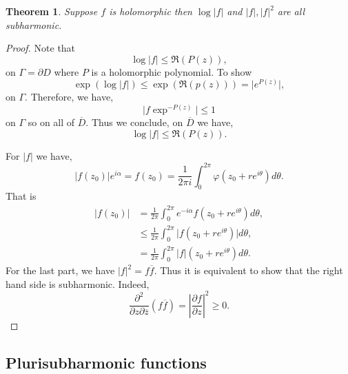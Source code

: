 \documentclass{article}
\newtheorem{theorem}{Theorem} [section]
\newcommand{\bd}[0]{\partial}
\newcommand{\normal}[0]{{\frac {1} {2\pi i}}}
\begin{document}
\begin{theorem}
  Suppose $f$ is holomorphic then $\log\vert f\vert$ and $\vert f\vert,\vert f\vert^2$ are all subharmonic.
\end{theorem}

\begin{proof}
  Note that 
  \begin{equation*}
    \log\vert f\vert\leq\Re(P(z)),
  \end{equation*}
  on $\Gamma = \bd D$ where $P$ is a holomorphic polynomial. To show 
  \begin{equation*}
    \exp(\log\vert f\vert)\leq\exp(\Re(p(z))) = \vert e^{P(z)}\vert,
  \end{equation*}
  on $\Gamma$. Therefore, we have,
  \begin{equation*}
    \vert f\exp^{-P(z)}\vert\leq 1
  \end{equation*}
  on $\Gamma$ so on all of $\overline{D}$. Thus we conclude, on $\overline{D}$ we have,
  \begin{equation*}
    \log\vert f\vert \leq\Re(P(z)).
  \end{equation*}
  \par For $\vert f\vert$ we have,
  \begin{equation*}
    \vert f(z_0)\vert e^{i\alpha} = f(z_0) = \normal\int_0^{2\pi}\varphi(z_0+re^{i\theta})d\theta.
  \end{equation*}
  That is 
  \begin{align*}
    \vert f(z_0)\vert & = {\frac 1 {2\pi}} \int_0^{2\pi}e^{-i\alpha}f(z_0+re^{i\theta})d\theta,\\
    & \leq {\frac 1 {2\pi}}\int_0^{2\pi}\vert f(z_0+re^{i\theta})\vert d\theta,\\
    & = {\frac 1 {2\pi}}\int_0^{2\pi}\vert f\vert (z_0+re^{i\theta})d\theta.
  \end{align*}
  For the last part, we have $\vert f\vert^2 = f\overline{f}$.  Thus it is equivalent to show that the right hand side is subharmonic. Indeed,
  \begin{equation*}
    {\frac {\partial^2} {\partial z\partial\overline{z}}}(f\overline{f}) = \left\vert{\frac {\partial f} {\partial z}}\right\vert^2\geq0.
  \end{equation*} 
\end{proof}

\subsection{Plurisubharmonic functions}
\end{document}
